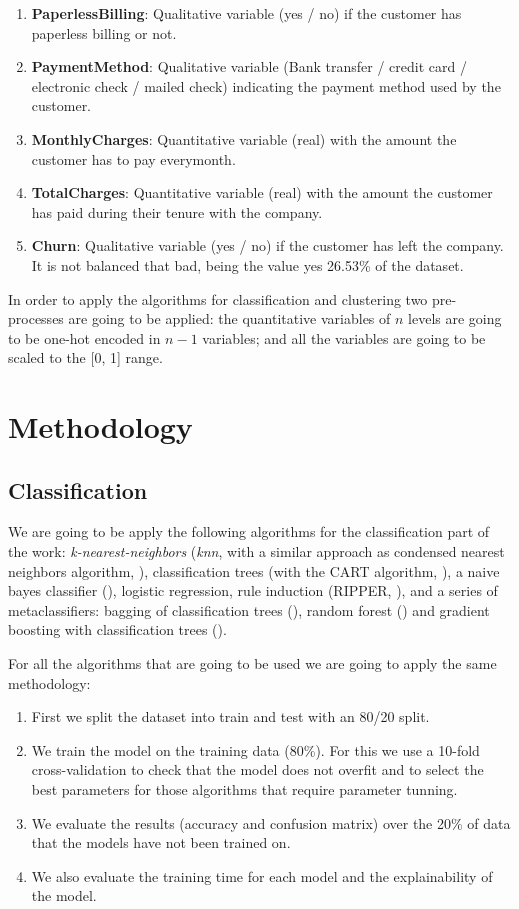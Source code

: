 \documentclass[a4paper,11pt]{article}
\begin{document}
\begin{enumerate}
	\item \textbf{PaperlessBilling}: Qualitative variable (yes / no) if the customer has paperless billing or not.
	\item \textbf{PaymentMethod}: Qualitative variable (Bank transfer / credit card / electronic check / mailed check) indicating the payment method used by the customer.
	\item \textbf{MonthlyCharges}: Quantitative variable (real) with the amount the customer has to pay everymonth.
	\item \textbf{TotalCharges}: Quantitative variable (real) with the amount the customer has paid during their tenure with the company.
	\item \textbf{Churn}: Qualitative variable (yes / no) if the customer has left the company. It is not balanced that bad, being the value yes 26.53\% of the dataset.
\end{enumerate}

In order to apply the algorithms for classification and clustering two pre-processes are going to be applied: the quantitative variables of $n$ levels are going to be one-hot encoded in $n-1$ variables; and all the variables are going to be scaled to the [0, 1] range.

\section{Methodology}

\subsection{Classification}

We are going to be apply the following algorithms for the classification part of the work: \textit{k-nearest-neighbors} (\textit{knn}, with a similar approach as condensed nearest neighbors algorithm, \cite{hart1968}), classification trees (with the CART algorithm, \cite{breiman1984}), a naive bayes classifier (\cite{minsky1961}), logistic regression, rule induction (RIPPER, \cite{cohen1995}), and a series of metaclassifiers: bagging of classification trees (\cite{breiman1996}), random forest (\cite{breiman2001}) and gradient boosting with classification trees (\cite{freund1997}).

For all the algorithms that are going to be used we are going to apply the same methodology:

\begin{enumerate}
	\item First we split the dataset into train and test with an 80/20 split.
	\item We train the model on the training data (80\%). For this we use a 10-fold cross-validation to check that the model does not overfit and to select the best parameters for those algorithms that require parameter tunning.
	\item We evaluate the results (accuracy and confusion matrix) over the 20\% of data that the models have not been trained on.
	\item We also evaluate the training time for each model and the explainability of the model.
\end{enumerate}
\end{document}

